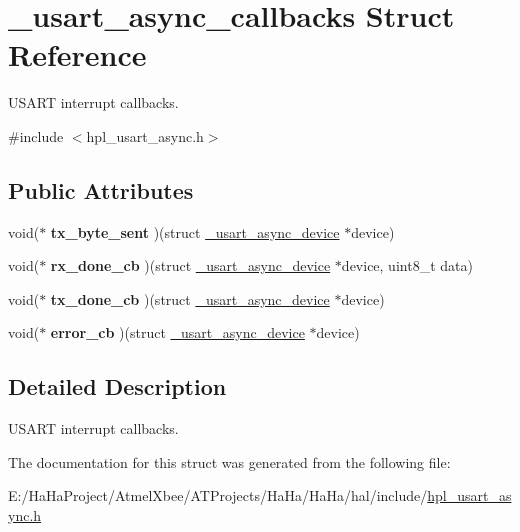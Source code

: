 \hypertarget{struct__usart__async__callbacks}{}\section{\+\_\+usart\+\_\+async\+\_\+callbacks Struct Reference}
\label{struct__usart__async__callbacks}


U\+S\+A\+RT interrupt callbacks.  




{\ttfamily \#include $<$hpl\+\_\+usart\+\_\+async.\+h$>$}

\subsection*{Public Attributes}
\begin{DoxyCompactItemize}
\item 
\mbox{\label{struct__usart__async__callbacks_a8213240efd24edc2266b1d499b42e945}} 
void($\ast$ {\bfseries tx\+\_\+byte\+\_\+sent} )(struct \hyperlink{struct__usart__async__device}{\+\_\+usart\+\_\+async\+\_\+device} $\ast$device)
\item 
\mbox{\label{struct__usart__async__callbacks_af3670aee54cc400737048dde5c64d30e}} 
void($\ast$ {\bfseries rx\+\_\+done\+\_\+cb} )(struct \hyperlink{struct__usart__async__device}{\+\_\+usart\+\_\+async\+\_\+device} $\ast$device, uint8\+\_\+t data)
\item 
\mbox{\label{struct__usart__async__callbacks_a71fe195e0159ee0b107df69b2b02f619}} 
void($\ast$ {\bfseries tx\+\_\+done\+\_\+cb} )(struct \hyperlink{struct__usart__async__device}{\+\_\+usart\+\_\+async\+\_\+device} $\ast$device)
\item 
\mbox{\label{struct__usart__async__callbacks_a7b926fce0dbc8debda16675111ae754a}} 
void($\ast$ {\bfseries error\+\_\+cb} )(struct \hyperlink{struct__usart__async__device}{\+\_\+usart\+\_\+async\+\_\+device} $\ast$device)
\end{DoxyCompactItemize}


\subsection{Detailed Description}
U\+S\+A\+RT interrupt callbacks. 

The documentation for this struct was generated from the following file\+:\begin{DoxyCompactItemize}
\item 
E\+:/\+Ha\+Ha\+Project/\+Atmel\+Xbee/\+A\+T\+Projects/\+Ha\+Ha/\+Ha\+Ha/hal/include/\hyperlink{hpl__usart__async_8h}{hpl\+\_\+usart\+\_\+async.\+h}\end{DoxyCompactItemize}
